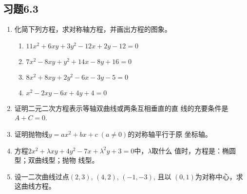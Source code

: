 \subsection*{习题6.3}
\begin{enumerate}
    \item 化简下列方程，求对称轴方程，并画出方程的图象。
\begin{enumerate}
    \item $11x^2+6xy+3y^2-12x+2y-12=0$
    \item $7x^2-8xy+y^2+14x-8y+16=0$
    \item $8x^2+8xy+2y^2-6x-3y-5=0$
    \item $x^2-2xy-6x+4y+4=0$
\end{enumerate}

\item 证明二元二次方程表示等轴双曲线或两条互相垂直的直
线的充要条件是$A+C=0$.
\item 证明抛物线$y=ax^2+bx+c\; (a\ne 0)$的对称轴平行于原
坐标轴。
\item 方程$2x^2+\lambda xy+4y^2-7x+\lambda^2y+3=0$中，$\lambda$取什么
值时，方程是：椭圆型；双曲线型；抛物
线型。
\item 设一二次曲线过点$(2,3)$, $(4,2)$, $(-1,-3)$, 且以
$(0,1)$为对称中心，求这曲线方程。
\end{enumerate}

